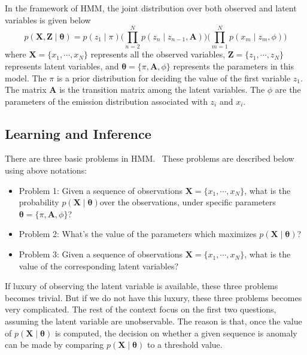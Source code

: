 In the framework of HMM, the joint distribution over both observed and latent variables is given below
\begin{equation}
	p(\mathbf{X}, \mathbf{Z} \mid \boldsymbol{\theta}) = p(z_1 \mid \pi) \big(\prod_{n=2}^{N}p(z_n\mid z_{n-1}, \mathbf{A})\big) \big(\prod_{m=1}^{N}p(x_m\mid z_m, \phi)\big)
	\label{eq:HMMcomplete}
\end{equation}
where \(\mathbf{X} = \{x_1, \cdots, x_N\}\) represents all the observed variables, \(\mathbf{Z} = \{z_1, \cdots, z_N\}\) represents latent variables, and \(\boldsymbol{\theta} = \{\pi, \mathbf{A}, \phi\}\) represents the parameters in this model. The \(\pi\) is a prior distribution for deciding the value of the first variable \(z_1\). The matrix \(\mathbf{A}\) is the transition matrix among the latent variables. The \(\phi\) are the parameters of the emission distribution associated with \(z_i\) and \(x_i\).

\subsection{Learning and Inference}
There are three basic problems in HMM.~\cite{rabiner1989tutorial}  These problems are described below using above notations:
\begin{itemize}
	\item Problem 1: Given a sequence of observations \(\mathbf{X} = \{x_1, \cdots, x_N\}\), what is the probability \(p(\mathbf{X} \mid \boldsymbol{\theta}) 			  \)over the observations, under specific parameters \(\boldsymbol{\theta} = \{\pi, \mathbf{A}, \phi\}\)?
	\item Problem 2: What's the value of the parameters which maximizes \(p(\mathbf{X} \mid \boldsymbol{\theta})\)?
	\item Problem 3: Given a sequence of observations \(\mathbf{X} = \{x_1, \cdots, x_N\}\), what is the value of the corresponding latent variables?
\end{itemize}
If luxury of observing the latent variable is available, these three problems becomes trivial. But if we do not have this luxury, these three problems becomes very complicated. The rest of the context focus on the first two questions, assuming the latent variable are unobservable. The reason is that, once the value of \(p(\mathbf{X} \mid \boldsymbol{\theta})\) is computed, the decision on whether a given sequence is anomaly can be made by comparing \(p(\mathbf{X} \mid \boldsymbol{\theta})\) to a threshold value.

